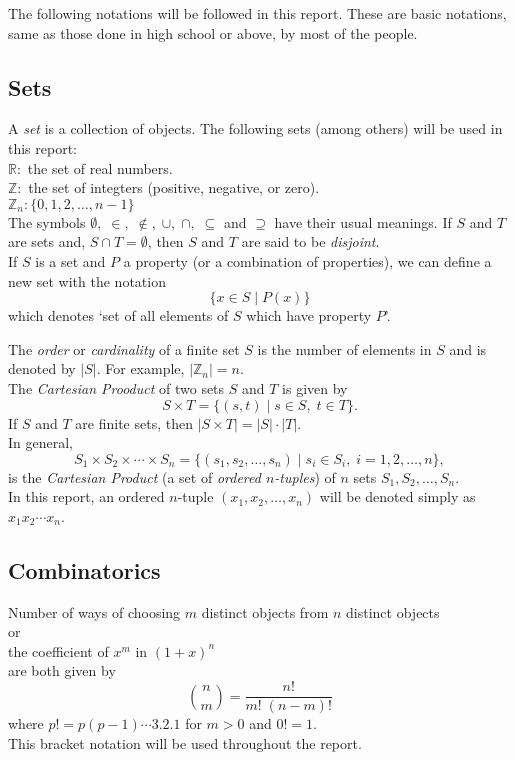\documentclass[../main.tex]{subfiles}
\begin{document}
The following notations will be followed in this report. These are basic notations, same as those done in high school or above, by most of the people.

\subsection*{Sets}
A \emph{set} is a collection of objects. The following sets (among others) will be used in this report:\\
$\mathbb{R}:$ the set of real numbers.\\
$\mathbb{Z}:$ the set of integters (positive, negative, or zero).\\
$\mathbb{Z}_n: \{0,1,2,\ldots,n-1\}$\\

The symbols $\emptyset,\; \in,\; \notin,\; \cup,\; \cap,\; \subseteq$ and $\supseteq$ have their usual meanings. If $S$ and $T$ are sets and, $S\cap T = \emptyset$, then $S$ and $T$ are said to be \emph{disjoint}.\\ 
If $S$ is a set and $P$ a property (or a combination of properties), we can define a new set with the notation
\[ \{x\in S\;|\;P(x)\} \]
which denotes `set of all elements of $S$ which have property $P$'.

The \emph{order} or \emph{cardinality} of a finite set $S$ is the number of elements in $S$ and is denoted by $|S|$. For example, $|\mathbb{Z}_n|=n$.\\
The \emph{Cartesian Prooduct} of two sets $S$ and $T$ is given by
\[ S\times T = \{(s, t)\;|\; s\in S,\;t\in T\}.\]
If $S$ and $T$ are finite sets, then $|S\times T| = |S|\cdot |T|$.\\
In general,
\[ S_1\times S_2\times \cdots \times S_n = \{(s_1, s_2, \ldots, s_n)\; |\; s_i\in S_i,\; i = 1,2,\ldots,n\}, \] is the \emph{Cartesian Product} (a set of \emph{ordered $n$-tuples}) of $n$ sets $S_1, S_2,\ldots, S_n$.\\
In this report, an ordered $n$-tuple $(x_1,x_2,\ldots,x_n)$ will be denoted simply as $x_1x_2\cdots x_n$. 

\subsection*{Combinatorics}
Number of ways of choosing $m$ distinct objects from $n$ distinct objects\\
or\\
the coefficient of $x^m$ in $(1+x)^n$\\ are both given by
\[ 
	\binom{n}{m} = \dfrac{n!}{m!\;(n-m)!}
\] 
where $p! = p(p-1)\cdots3.2.1 $ for $m> 0$ and $0! = 1$.\\
This bracket notation will be used throughout the report.\\
\end{document}
